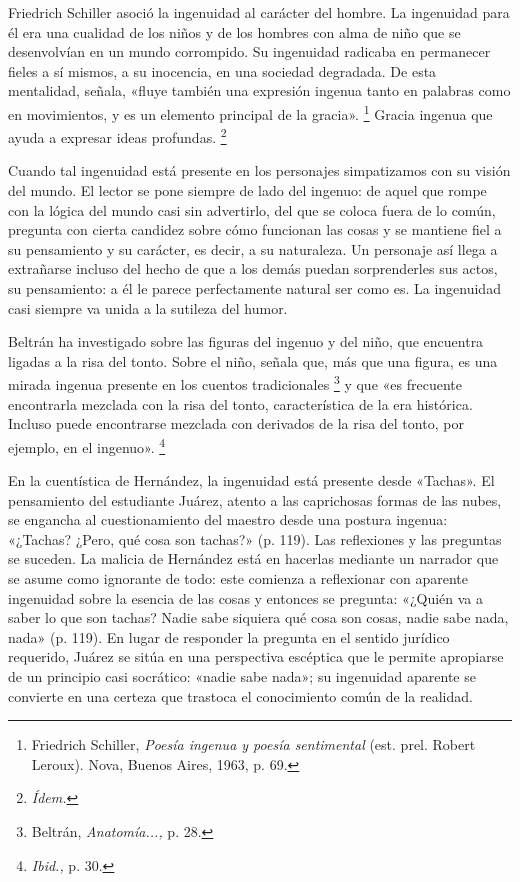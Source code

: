 \documentclass[14pt,twoside,final]{extbook} %
\let\oldfootnote\footnote
\renewcommand\footnote[1]{%
\oldfootnote{\hspace{1mm}#1}}
\begin{document}
Friedrich Schiller asoció la ingenuidad al carácter del hombre. La ingenuidad para él era una cualidad de los niños y de los hombres con alma de niño que se desenvolvían en un mundo corrompido. Su ingenuidad radicaba en permanecer fieles a sí mismos, a su inocencia, en una sociedad degradada. De esta mentalidad, señala, «fluye también una expresión ingenua tanto en palabras como en movimientos, y es un elemento principal de la gracia».\footnote{Friedrich Schiller, \emph{Poesía ingenua y poesía sentimental} (est. prel. Robert Leroux). Nova, Buenos Aires, 1963, p. 69.} Gracia ingenua que ayuda a expresar ideas profundas.\footnote{\em Ídem.}

Cuando tal ingenuidad está presente en los personajes simpatizamos con su visión del mundo. El lector se pone siempre de lado del ingenuo: de aquel que rompe con la lógica del mundo casi sin advertirlo, del que se coloca fuera de lo común, pregunta con cierta candidez sobre cómo funcionan las cosas y se mantiene fiel a su pensamiento y su carácter, es decir, a su naturaleza. Un personaje así llega a extrañarse incluso del hecho de que a los demás puedan sorprenderles sus actos, su pensamiento: a él le parece perfectamente natural ser como es. La ingenuidad casi siempre va unida a la sutileza del humor.

Beltrán ha investigado sobre las figuras del ingenuo y del niño, que encuentra ligadas a la risa del tonto. Sobre el niño, señala que, más que una figura, es una mirada ingenua presente en los cuentos tradicionales\footnote{Beltrán, \emph{Anatomía...,} p. 28.} y que «es frecuente encontrarla mezclada con la risa del tonto, característica de la era histórica. Incluso puede encontrarse mezclada con derivados de la risa del tonto, por ejemplo, en el ingenuo».\footnote{\emph{Ibid.,} p. 30.}

En la cuentística de Hernández, la ingenuidad está presente desde «Tachas». El pensamiento del estudiante Juárez, atento a las caprichosas formas de las nubes, se engancha al cuestionamiento del maestro desde una postura ingenua: «¿Tachas? ¿Pero, qué cosa son tachas?» (p. 119). Las reflexiones y las preguntas se suceden. La malicia de Hernández está en hacerlas mediante un narrador que se asume como ignorante de todo: este comienza a reflexionar con aparente ingenuidad sobre la esencia de las cosas y entonces se pregunta: «¿Quién va a saber lo que son tachas? Nadie sabe siquiera qué cosa son cosas, nadie sabe nada, nada» (p. 119). En lugar de responder la pregunta en el sentido jurídico
requerido, Juárez se sitúa en una perspectiva escéptica que le permite apropiarse de un principio casi socrático: «nadie sabe nada»; su ingenuidad aparente se convierte en una certeza que trastoca el conocimiento común de la realidad.
\end{document}
